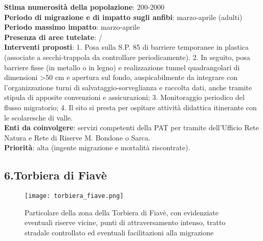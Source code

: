 \documentclass[11pt,a4paper,twoside]{memoir}
\begin{document}
\textbf{Stima numerosità della popolazione}: 200-2000 \\
\textbf{Periodo di migrazione e di impatto sugli anfibi}: marzo-aprile (adulti) \\
\textbf{Periodo massimo impatto}: marzo-aprile \\
\textbf{Presenza di aree tutelate}: / \\
\textbf{Interventi proposti}: 1. Posa sulla S.P. 85 di barriere temporanee in plastica (associate a secchi-trappola da controllare periodicamente). 2. In seguito, posa barriere fisse (in metallo o in legno) e realizzazione tunnel quadrangolari di dimensioni >50 cm e apertura sul fondo, auspicabilmente da integrare con l'organizzazione turni di salvataggio-sorveglianza e raccolta dati, anche tramite stipula di apposite convenzioni e assicurazioni; 3. Monitoraggio periodico del flusso migratorio; 4.  Il sito si presta per ospitare attività didattica itinerante con le scolaresche di valle.  \\
\textbf{Enti da coinvolgere}: servizi competenti della PAT per tramite dell’Ufficio Rete Natura e Rete di Riserve M. Bondone o Sarca. \\
\textbf{Priorità}: alta (ingente migrazione e mortalità riscontrate). \\

\newpage
\begin{tcolorbox}[breakable,colback=white,colframe=green,width=10cm]
\subsection{6.Torbiera di Fiavè}
\end{tcolorbox}

\begin{figure}[H]
\label{fig:map_fiave}
\centering
  \texttt{[image: torbiera\_fiave.png]}
\caption{Particolare della zona della Torbiera di Fiavè, con evidenziate eventuali riserve vicine, punti di attraversamento intenso, tratto stradale controllato ed eventuali facilitazioni alla migrazione}
\end{figure}
\end{document}
